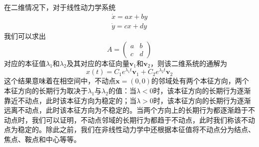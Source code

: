 在二维情况下，对于线性动力学系统
\begin{equation}
    \begin{aligned}
        \dot{x}=ax+by\\
        \dot{y}=cx+dy
    \end{aligned}
\end{equation}
我们可以求出
\begin{equation}
    A=\begin{pmatrix}
        a & b \\
        c & d
    \end{pmatrix}
\end{equation}
对应的本征值$\lambda_1$和$\lambda_2$及其对应的本征向量$\mathbf{v}_1$和$\mathbf{v}_2$，则该二维系统的通解为
\begin{equation}
    x(t)=C_1e^{\lambda_1t}\mathbf{v}_1+C_2e^{\lambda_2t}\mathbf{v}_2
\end{equation}
这个结果意味着在相空间中，不动点$\mathbf{x}=(0,0)$的邻域处有两个本征方向，两个本征方向的长期行为取决于$\lambda_1$与$\lambda_2$的值：当$\lambda<0$时，该本征方向的长期行为逐渐靠近不动点，此时该本征方向为稳定的；当$\lambda>0$时，该本征方向的长期行为逐渐远离不动点，此时该本征方向为不稳定的。当两个方向上的长期行为都逐渐趋于不动点时，我们可以证明，不动点邻域的长期行为都趋于不动点，此时我们称该不动点为稳定的。除此之前，我们在非线性动力学中还根据本征值将不动点分为结点、焦点、鞍点和中心等等。

